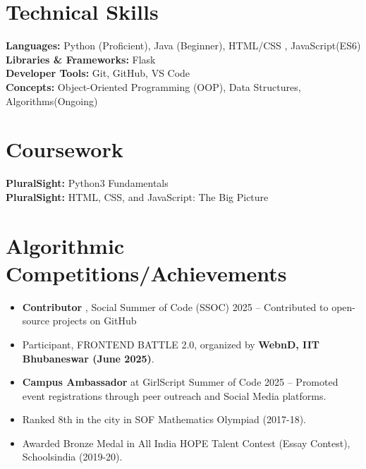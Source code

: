 \documentclass[letterpaper,11pt]{article}
\newcommand{\resumeItem}[1]{
  \item\small{
    {#1 \vspace{-2pt}}
  }
}
\newcommand{\resumeItemListStart}{\begin{itemize}}
\newcommand{\resumeItemListEnd}{\end{itemize}\vspace{-5pt}}
\begin{document}
\section{Technical Skills}
\begin{itemize}[leftmargin=0.15in, label={}]
    {\item{
       
        \textbf{Languages:} Python (Proficient), Java (Beginner), HTML/CSS , JavaScript(ES6)\\
        \textbf{Libraries \& Frameworks:} Flask\\
        \textbf{Developer Tools:} Git, GitHub, VS Code\\
        \textbf{Concepts:} Object-Oriented Programming (OOP), Data Structures, Algorithms(Ongoing)\\
        
    }}
\end{itemize}

\section{ Coursework}
\begin{itemize}[leftmargin=0.15in, label={}]
\small{\item{
       
        \textbf{PluralSight:} Python3 Fundamentals \\
        \textbf{PluralSight:} HTML, CSS, and JavaScript: The Big Picture\\ }}

\end{itemize}

\section{Algorithmic Competitions/Achievements}
\resumeItemListStart
  \resumeItem{\textbf{Contributor} , Social Summer of Code (SSOC) 2025 – Contributed to open-source projects on GitHub }
  \resumeItem{Participant, FRONTEND BATTLE 2.0, organized by \textbf{WebnD, IIT Bhubaneswar (June 2025)}.}
  \resumeItem{\textbf{Campus Ambassador} at GirlScript Summer of Code 2025 – Promoted event registrations through peer outreach and Social Media platforms.}
  \resumeItem{Ranked 8th in the city in SOF Mathematics Olympiad (2017-18).}
  \resumeItem{Awarded Bronze Medal in All India HOPE Talent Contest (Essay Contest), Schoolsindia (2019-20).}
\resumeItemListEnd



\end{document}
